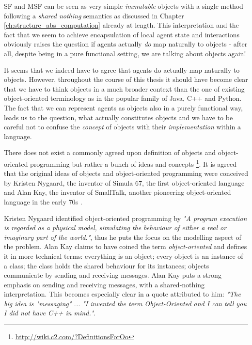 SF and MSF can be seen as very simple \textit{immutable} objects with a single method following a \textit{shared nothing} semantics as discussed in Chapter \ref{ch:structure_abs_computation} already at length. This interpretation and the fact that we seem to achieve encapsulation of local agent state and interactions obviously raises the question if agents actually \textit{do} map naturally to objects - after all, despite being in a pure functional setting, we are talking about objects again!

It seems that we indeed have to agree that agents do actually map naturally to objects. However, throughout the course of this thesis it should have become clear that we have to think objects in a much broader context than the one of existing object-oriented terminology as in the popular family of Java, C++ and Python. The fact that we can represent agents as objects also in a purely functional way, leads us to the question, what actually constitutes objects and we have to be careful not to confuse the \textit{concept} of objects with their \textit{implementation} within a language.

\medskip

There does not exist a commonly agreed upon definition of objects and object-oriented programming but rather a bunch of ideas and concepts \footnote{\url{http://wiki.c2.com/?DefinitionsForOo}}. It is agreed that the original ideas of objects and object-oriented programming were conceived by Kristen Nygaard, the inventor of Simula 67, the first object-oriented language \cite{dahl_birth_2002} and Alan Kay, the inventor of SmallTalk, another pioneering object-oriented language in the early 70s \cite{kay_early_1993}. %

Kristen Nygaard identified object-oriented programming by \textit{"A program execution is regarded as a physical model, simulating the behaviour of either a real or imaginary part of the world."}, thus he puts the focus on the modelling aspect of the problem. Alan Kay claims to have coined the term \textit{object-oriented} and defines it in more technical terms: everything is an object; every object is an instance of a class; the class holds the shared behaviour for its instances; objects communicate by sending and receiving messages. Alan Kay puts a strong emphasis on sending and receiving messages, with a shared-nothing interpretation. This becomes especially clear in a quote attributed to him: \textit{"The big idea is "messaging" ... "I invented the term Object-Oriented and I can tell you I did not have C++ in mind."}.

